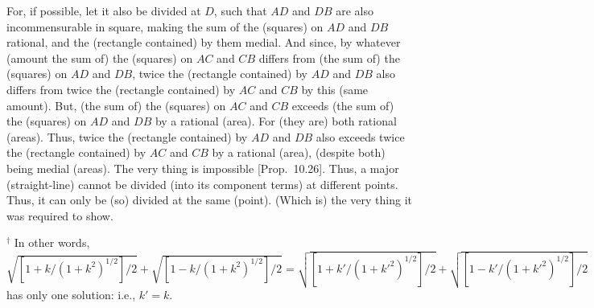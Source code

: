 \begin{Parallel}{}{}
{For, if possible, let it also be divided at $D$, such that $AD$ and
$DB$ are also incommensurable in square, making the
sum of the (squares) on $AD$ and $DB$ rational, and the (rectangle contained) by them medial. And since, by whatever (amount the sum of)
the (squares) on $AC$ and $CB$ differs from (the sum of) the (squares)
on $AD$ and $DB$, 
twice the (rectangle contained) by $AD$ and $DB$ also differs from
twice the (rectangle contained) by $AC$ and $CB$ by this (same amount). But, (the sum of) the
(squares) on $AC$ and $CB$ exceeds (the sum of) the (squares) on
$AD$ and $DB$ by a rational (area). For (they are) both rational (areas). Thus, twice the
(rectangle contained) by $AD$ and $DB$ also exceeds twice the
(rectangle contained) by $AC$ and $CB$ by a rational (area), (despite both) being medial (areas).
The very thing is impossible [Prop.~10.26].
Thus, a major (straight-line) cannot be divided (into its component terms) at different points. Thus,
it can only be (so) divided at the same (point). (Which is) the very thing it was required to show.}
\end{Parallel}
{\footnotesize\noindent$^\dag$ In other words, $\sqrt{[1+k/(1+k^2)^{1/2}]/2} + \sqrt{[1-k/(1+k^2)^{1/2}]/2} =\sqrt{[1+k'/(1+k'^2)^{1/2}]/2} + \sqrt{[1-k'/(1+k'^2)^{1/2}]/2}$ has only one solution: {i.e.}, $k'=k$.}


